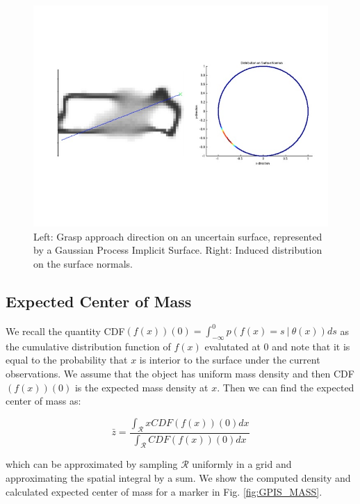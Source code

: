 \documentclass[letterpaper, 10 pt, conference]{ieeeconf}  %
\begin{document}
\begin{figure}[ht!]
\centering
\includegraphics[scale = 0.3]{figures/Slide05.jpg}
\caption{Left: Grasp approach direction on an uncertain surface, represented by a Gaussian Process Implicit Surface.
Right: Induced distribution on the surface normals.}
\vspace*{-10pt}
\label{fig:GraspSurfaceNormals}
\end{figure}

\subsection{Expected Center of Mass} 

We recall the quantity CDF$(f(x))(0) = \int_{-\infty}^{0} p(f(x) =  s \ | \ \theta(x)) ds$ as the cumulative distribution function of $f(x)$ evalutated at 0 and note that it is equal to the probability that $x$ is interior to the surface under the current observations.
We assume that the object has uniform mass density and then CDF$(f(x))(0)$ is the expected mass density at $x$.
Then we can find the expected center of mass as:

\begin{equation}
  \bar{z} 
  =
  \frac
    {\int_{\mathcal{R}}x CDF(f(x))(0) dx}
    {\int_{\mathcal{R}}  CDF(f(x))(0) dx}
\end{equation}

which can be approximated by sampling $\mathcal{R}$ uniformly in a grid and approximating the spatial integral by a sum. We show the computed density and calculated expected center of mass for a marker in Fig. \ref{fig:GPIS_MASS}.
\end{document}
